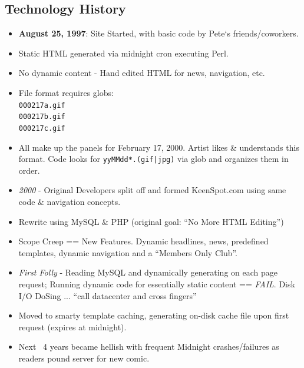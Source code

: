 \documentclass{beamer}
\newenvironment{itemizeframe}
               {\begin{frame}\startitemizeframe} 
               {\stopitemizeframe\end{frame}}
\newcommand\startitemizeframe{\begin{itemize}} \newcommand\stopitemizeframe{\end{itemize}}
\begin{document}
\subsection[About Sluggy.com]{Technology History}

\begin{itemizeframe}
\frametitle{Sluggy.com Technology History}
\framesubtitle{1997 - 2000}
	\item {\bf August 25, 1997}: Site Started, with basic code by Pete`s friends/coworkers. 
	\item Static HTML generated via midnight cron executing Perl.  
	\item No dynamic content - Hand edited HTML for news, navigation, etc.
	\item File format requires globs: \texttt{\\000217a.gif\\000217b.gif\\000217c.gif} 
	\item All make up the panels for February 17, 2000.  Artist likes \& understands this format.  Code looks for \texttt{yyMMdd*.(gif|jpg)} via glob and organizes them in order.
	\item {\em 2000} - Original Developers split off and formed KeenSpot.com using same code \& navigation concepts.
\end{itemizeframe}

\begin{itemizeframe}
    \frametitle{Sluggy.com Technology History}
    \framesubtitle{~2002}
	\item Rewrite using MySQL \& PHP (original goal: ``No More HTML Editing'')
	\item Scope Creep == New Features. Dynamic headlines, news, predefined templates, dynamic navigation and a ``Members Only Club''.
	\item {\em First Folly} - Reading MySQL and dynamically generating on each page request; Running dynamic code for essentially static content == {\em FAIL}.  Disk I/O DoSing ... ``call datacenter and cross fingers''
	\item Moved to smarty template caching, generating on-disk cache file upon first request (expires at midnight).
	\item Next ~4 years became hellish with frequent Midnight crashes/failures as readers pound server for new comic.
\end{itemizeframe}
\end{document}
